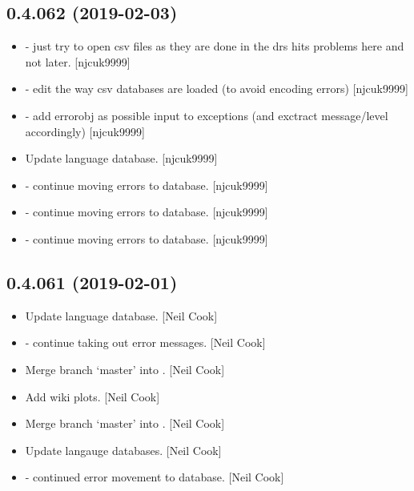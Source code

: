\documentclass[a4paper,10pt,english]{report}
\begin{document}
\subsection{0.4.062 (2019-02-03)}
\label{\detokenize{misc/changelog:id197}}\begin{itemize}
\item {} 
 - just try to open csv files as they are done in the
drs \textendash{} hits problems here and not later. {[}njcuk9999{]}

\item {} 
 - edit the way csv databases are loaded (to avoid encoding
errors) {[}njcuk9999{]}

\item {} 
 - add errorobj as possible input to exceptions (and
exctract message/level accordingly) {[}njcuk9999{]}

\item {} 
Update language database. {[}njcuk9999{]}

\item {} 
 - continue moving errors to database. {[}njcuk9999{]}

\item {} 
 - continue moving errors to database. {[}njcuk9999{]}

\item {} 
 - continue moving errors to database. {[}njcuk9999{]}

\end{itemize}


\subsection{0.4.061 (2019-02-01)}
\label{\detokenize{misc/changelog:id198}}\begin{itemize}
\item {} 
Update language database. {[}Neil Cook{]}

\item {} 
 - continue taking out error messages. {[}Neil Cook{]}

\item {} 
Merge branch ‘master’ into . {[}Neil Cook{]}

\item {} 
Add wiki plots. {[}Neil Cook{]}

\item {} 
Merge branch ‘master’ into . {[}Neil Cook{]}

\item {} 
Update langauge databases. {[}Neil Cook{]}

\item {} 
 - continued error movement to database. {[}Neil Cook{]}

\end{itemize}
\end{document}
